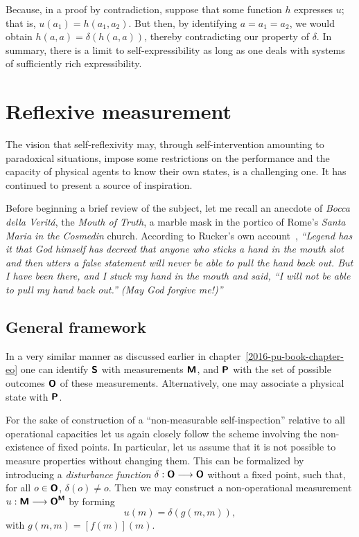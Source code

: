 Because, in a proof by contradiction, suppose that some function $h$ expresses $u$;
that is,  $u(a_1) = h(a_1,a_2)$.
But then, by identifying $a=a_1=a_2$, we would obtain
$h(a,a)=\delta(h(a,a))$,
thereby contradicting our property of $\delta$.
In summary, there is a limit to self-expressibility as long as one deals with
systems of sufficiently rich expressibility.

\chapter{Reflexive measurement}
\label{2016-pu-book-chapter-rm}

The vision that self-reflexivity may, through self-intervention amounting to paradoxical situations,
impose some restrictions on the performance and the capacity of physical agents
to know their own states, is a challenging one.
It has continued to present a source of inspiration.

Before beginning a brief review of the subject,
let me recall an anecdote of {\it Bocca della Verit\'a},
the {\em Mouth of Truth}, a marble mask in the portico of Rome's {\em Santa Maria in the Cosmedin} church.
According to Rucker's own account~\cite[p.~178]{rucker},
{\em ``Legend has it that God himself has decreed that
anyone who sticks a hand in the mouth slot and then utters a false statement will never be able to pull the hand back out. But I have been
there, and I stuck my hand in the mouth and said, ``I will not be able to
pull my hand back out.'' (May God forgive me!)''}

\section{General framework}
\label{2016-pu-book-chapter-rm-gf}

In a very similar manner as discussed earlier in chapter~\ref{2016-pu-book-chapter-eo}
one can identify $\textsf{\textbf{S}}$ with measurements $\textsf{\textbf{M}}$,
and $\textsf{\textbf{P}}$ with the set of possible outcomes $\textsf{\textbf{O}}$ of these measurements.
Alternatively, one may associate a physical state with $\textsf{\textbf{P}}$.

For the sake of construction of a ``non-measurable self-inspection'' relative to
all operational capacities
let us again closely follow the scheme involving the non-existence of fixed points.
In particular, let us assume that it is not possible to measure properties without changing them.
This can be formalized by
introducing a {\em disturbance function}
$\delta : \textsf{\textbf{O}} \longrightarrow \textsf{\textbf{O}}$
without a fixed point,
such that, for all $o\in \textsf{\textbf{O}}$, $\delta (o)\neq o$.
Then we may construct a non-operational measurement
$u: \textsf{\textbf{M}} \longrightarrow \textsf{\textbf{O}}^\textsf{\textbf{M}}$
by forming
\begin{equation}
u(m) = \delta(g(m,m)),
\end{equation}
with $g(m,m) = [f(m)](m)$.

